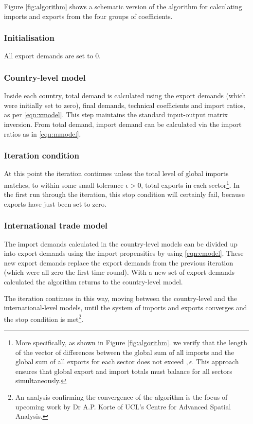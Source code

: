 \documentclass{article}
\begin{document}
Figure \ref{fig:algorithm} shows a schematic version of the algorithm for calculating imports and exports from the four groups of coefficients.
\subsubsection*{Initialisation}
All export demands are set to 0.

\subsubsection*{Country-level model}
Inside each country, total demand is calculated using the export demands (which were initially set to zero), final demands, technical coefficients and import ratios, as per \cref{eqn:xmodel}.
This step maintains the standard input-output matrix inversion.
From total demand, import demand can be calculated via the import ratios as in \cref{eqn:mmodel}.

\subsubsection*{Iteration condition}
At this point the iteration continues unless the total level of global imports matches, to within some small tolerance $\epsilon > 0$, total exports in each sector\footnote{More specifically, as shown in Figure \ref{fig:algorithm}. we verify that the length of the vector of differences between the global sum of all imports and the global sum of all exports for each sector does not exceed $, \epsilon$. This approach ensures that global export and import totals must balance for all sectors simultaneously.}.
In the first run through the iteration, this stop condition will certainly fail, because exports have just been set to zero.

\subsubsection*{International trade model}
The import demands calculated in the country-level models can be divided up into export demands using the import propensities by using \cref{eqn:emodel}.
These new export demands replace the export demands from the previous iteration (which were all zero the first time round).
With a new set of export demands calculated the algorithm returns to the country-level model.

The iteration continues in this way, moving between the country-level and the international-level models, until the system of imports and exports converges and the stop condition is met\footnote{An analysis confirming the convergence of the algorithm is the focus of upcoming work by Dr A.P. Korte of UCL's Centre for Advanced Spatial Analysis.}.
\end{document}
